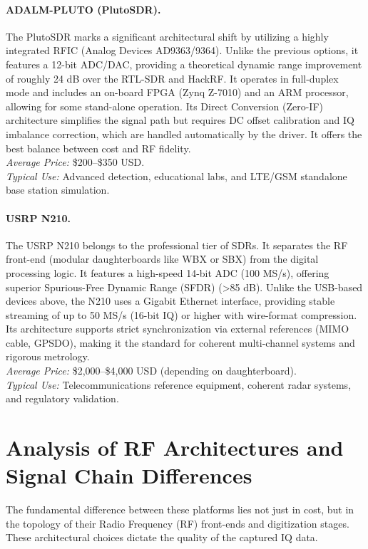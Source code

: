 \documentclass[11pt]{article}
\begin{document}
\paragraph{ADALM-PLUTO (PlutoSDR).}
The PlutoSDR marks a significant architectural shift by utilizing a highly integrated RFIC (Analog Devices AD9363/9364). Unlike the previous options, it features a 12-bit ADC/DAC, providing a theoretical dynamic range improvement of roughly 24 dB over the RTL-SDR and HackRF. It operates in full-duplex mode and includes an on-board FPGA (Zynq Z-7010) and an ARM processor, allowing for some stand-alone operation. Its Direct Conversion (Zero-IF) architecture simplifies the signal path but requires DC offset calibration and IQ imbalance correction, which are handled automatically by the driver. It offers the best balance between cost and RF fidelity.\\
\emph{Average Price:} \$200--\$350 USD.\\
\emph{Typical Use:} Advanced detection, educational labs, and LTE/GSM standalone base station simulation.

\paragraph{USRP N210.}
The USRP N210 belongs to the professional tier of SDRs. It separates the RF front-end (modular daughterboards like WBX or SBX) from the digital processing logic. It features a high-speed 14-bit ADC (100 MS/s), offering superior Spurious-Free Dynamic Range (SFDR) (>85 dB). Unlike the USB-based devices above, the N210 uses a Gigabit Ethernet interface, providing stable streaming of up to 50 MS/s (16-bit IQ) or higher with wire-format compression. Its architecture supports strict synchronization via external references (MIMO cable, GPSDO), making it the standard for coherent multi-channel systems and rigorous metrology.\\
\emph{Average Price:} \$2,000--\$4,000 USD (depending on daughterboard).\\
\emph{Typical Use:} Telecommunications reference equipment, coherent radar systems, and regulatory validation.

\section{Analysis of RF Architectures and Signal Chain Differences}

The fundamental difference between these platforms lies not just in cost, but in the topology of their Radio Frequency (RF) front-ends and digitization stages. These architectural choices dictate the quality of the captured IQ data.
\end{document}
